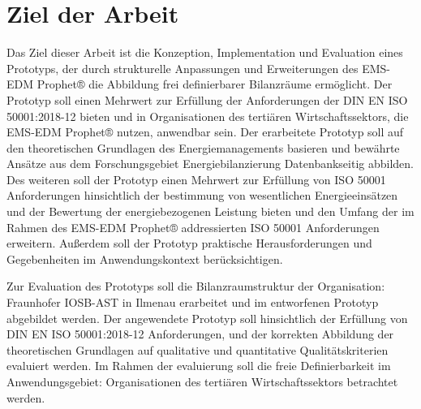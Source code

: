 \section{Ziel der Arbeit}

Das Ziel dieser Arbeit ist die Konzeption, Implementation und Evaluation eines Prototyps, der durch strukturelle Anpassungen und 
Erweiterungen des EMS-EDM Prophet® die Abbildung frei definierbarer Bilanzräume ermöglicht. Der Prototyp soll einen Mehrwert zur 
Erfüllung der Anforderungen der DIN EN ISO 50001:2018-12 bieten und in Organisationen des tertiären Wirtschaftssektors, die EMS-EDM Prophet® nutzen, 
anwendbar sein. 
Der erarbeitete Prototyp soll auf den theoretischen Grundlagen des Energiemanagements basieren und bewährte Ansätze 
aus dem Forschungsgebiet Energiebilanzierung Datenbankseitig abbilden.
Des weiteren soll der Prototyp einen Mehrwert zur Erfüllung von ISO 50001 Anforderungen hinsichtlich der bestimmung von wesentlichen Energieeinsätzen und 
der Bewertung der energiebezogenen Leistung bieten und den Umfang der im Rahmen des EMS-EDM Prophet® addressierten ISO 50001 Anforderungen erweitern.
Außerdem soll der Prototyp praktische Herausforderungen und Gegebenheiten im Anwendungskontext berücksichtigen.


Zur Evaluation des Prototyps soll die Bilanzraumstruktur der Organisation: Fraunhofer IOSB-AST in Ilmenau erarbeitet und im entworfenen Prototyp abgebildet werden.
Der angewendete Prototyp soll hinsichtlich der Erfüllung von DIN EN ISO 50001:2018-12 Anforderungen, und der korrekten Abbildung der theoretischen Grundlagen 
auf qualitative und quantitative Qualitätskriterien evaluiert werden.
Im Rahmen der evaluierung soll die freie Definierbarkeit im Anwendungsgebiet: Organisationen des tertiären Wirtschaftssektors betrachtet werden. 